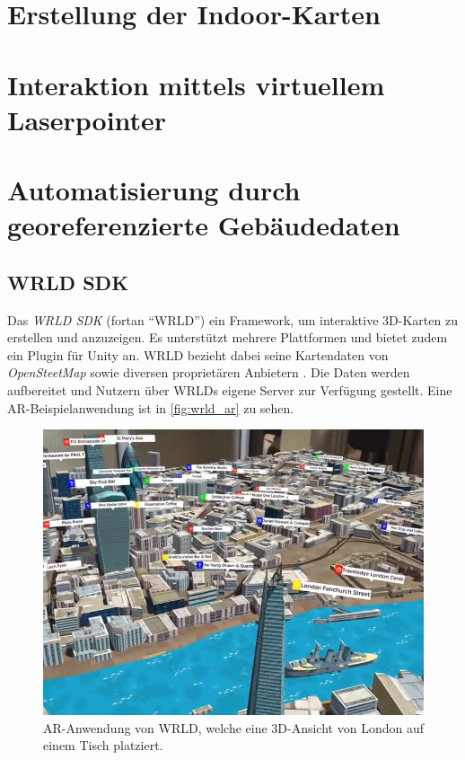 \section{Erstellung der Indoor-Karten}
\label{sec:indoor_maps}

\section{Interaktion mittels virtuellem Laserpointer}

\section{Automatisierung durch georeferenzierte Gebäudedaten}

\subsection{WRLD SDK}

Das \emph{WRLD SDK} (fortan \enquote{WRLD}) ein Framework, um interaktive 3D-Karten zu erstellen und anzuzeigen.
Es unterstützt mehrere Plattformen und bietet zudem ein Plugin für Unity an.
WRLD bezieht dabei seine Kartendaten von \emph{OpenSteetMap} sowie diversen proprietären Anbietern \parencite{WRLD2018}.
Die Daten werden aufbereitet und Nutzern über WRLDs eigene Server zur Verfügung gestellt.
Eine AR-Beispielanwendung ist in \autoref{fig:wrld_ar} zu sehen.
\begin{figure}
    \centering
    \includegraphics[width=\textwidth]{figures/wrld_ar-web-11}
    \caption{AR-Anwendung von WRLD, welche eine 3D-Ansicht von London auf einem Tisch platziert. }
    \label{fig:wrld_ar}
\end{figure}

